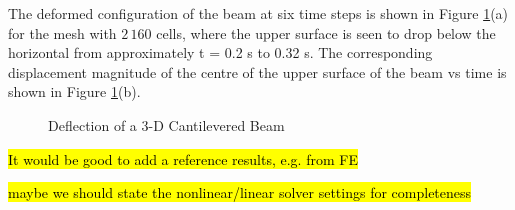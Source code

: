 \documentclass[sn-mathphys,Numbered]{sn-jnl}%
\begin{document}
The deformed configuration of the beam at six time steps is shown in Figure \ref{fig:dynamic_cantilever}(a) for the mesh with $2\,160$ cells, where the upper surface is seen to drop below the horizontal from approximately t = 0.2 s to 0.32 s.
The corresponding displacement magnitude of the centre of the upper surface of the beam vs time is shown in Figure \ref{fig:dynamic_cantilever}(b).
\begin{figure}[htbp]
   \centering
	 \quad
   \caption{Deflection of a 3-D Cantilevered Beam}
   \label{fig:dynamic_cantilever}
\end{figure}
\hl{It would be good to add a reference results, e.g. from FE}


\hl{maybe we should state the nonlinear/linear solver settings for completeness}
\end{document}
